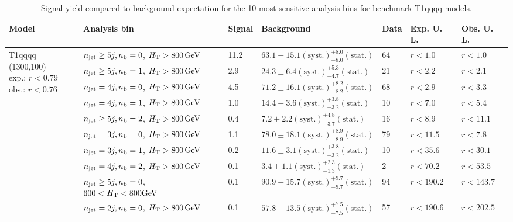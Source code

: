\begin{table}[h!] 
  \scriptsize
  \caption{ 
Signal yield compared to background expectation for the 10 most sensitive analysis bins 
for benchmark T1qqqq models.
  \label{tab:sigBenchmarksYields_T1qqqq}}
  \centering 
  \begin{tabular}{ lllllll } 
    \hline 
    \hline 
    Model & Analysis bin & Signal & Background & Data & Exp. U. L. & Obs. U. L. \\ \hline
\multirow{10}{*}{\parbox[t]{2cm}{T1qqqq (1300,100)\\exp.: $r<0.79$\\obs.: $r<0.76$}}
 & $n_{\mathrm{jet}} \geq5j,n_{\text{b}} =0$, $\mbox{$H_\text{T}$} > 800 \, \mathrm{GeV}$ & 11.2 & $63.1 \pm 15.1 \mathrm{(syst.)} ^{+8.0}_{-8.0} \mathrm{(stat.)}$ & 64 & $r < 1.0$ & $r < 1.0$\\ 
 & $n_{\mathrm{jet}} \geq5j,n_{\text{b}} =1$, $\mbox{$H_\text{T}$} > 800 \, \mathrm{GeV}$ & 2.9 & $24.3 \pm 6.4 \mathrm{(syst.)} ^{+5.3}_{-4.7} \mathrm{(stat.)}$ & 21 & $r < 2.2$ & $r < 2.1$\\ 
 & $n_{\mathrm{jet}} =4j,n_{\text{b}} =0$, $\mbox{$H_\text{T}$} > 800 \, \mathrm{GeV}$ & 4.5 & $71.2 \pm 16.1 \mathrm{(syst.)} ^{+8.2}_{-8.2} \mathrm{(stat.)}$ & 68 & $r < 2.9$ & $r < 3.3$\\ 
 & $n_{\mathrm{jet}} =4j,n_{\text{b}} =1$, $\mbox{$H_\text{T}$} > 800 \, \mathrm{GeV}$ & 1.0 & $14.4 \pm 3.6 \mathrm{(syst.)} ^{+3.8}_{-3.2} \mathrm{(stat.)}$ & 10 & $r < 7.0$ & $r < 5.4$\\ 
 & $n_{\mathrm{jet}} \geq5j,n_{\text{b}} =2$, $\mbox{$H_\text{T}$} > 800 \, \mathrm{GeV}$ & 0.4 & $7.2 \pm 2.2 \mathrm{(syst.)} ^{+4.8}_{-3.7} \mathrm{(stat.)}$ & 16 & $r < 8.9$ & $r < 11.1$\\ 
 & $n_{\mathrm{jet}} =3j,n_{\text{b}} =0$, $\mbox{$H_\text{T}$} > 800 \, \mathrm{GeV}$ & 1.1 & $78.0 \pm 18.1 \mathrm{(syst.)} ^{+8.9}_{-8.9} \mathrm{(stat.)}$ & 79 & $r < 11.5$ & $r < 7.8$\\ 
 & $n_{\mathrm{jet}} =3j,n_{\text{b}} =1$, $\mbox{$H_\text{T}$} > 800 \, \mathrm{GeV}$ & 0.2 & $11.6 \pm 3.1 \mathrm{(syst.)} ^{+3.8}_{-3.2} \mathrm{(stat.)}$ & 10 & $r < 35.6$ & $r < 30.1$\\ 
 & $n_{\mathrm{jet}} =4j,n_{\text{b}} =2$, $\mbox{$H_\text{T}$} > 800 \, \mathrm{GeV}$ & 0.1 & $3.4 \pm 1.1 \mathrm{(syst.)} ^{+2.3}_{-1.3} \mathrm{(stat.)}$ & 2 & $r < 70.2$ & $r < 53.5$\\ 
 & $n_{\mathrm{jet}} \geq5j,n_{\text{b}} =0$, $600 < \mbox{$H_\text{T}$} < 800 \mathrm{GeV}$ & 0.1 & $90.9 \pm 15.7 \mathrm{(syst.)} ^{+9.7}_{-9.7} \mathrm{(stat.)}$ & 94 & $r < 190.2$ & $r < 143.7$\\ 
 & $n_{\mathrm{jet}} =2j,n_{\text{b}} =0$, $\mbox{$H_\text{T}$} > 800 \, \mathrm{GeV}$ & 0.1 & $57.8 \pm 13.5 \mathrm{(syst.)} ^{+7.5}_{-7.5} \mathrm{(stat.)}$ & 57 & $r < 190.6$ & $r < 202.5$\\ \hline

\end{tabular}
\end{table}

